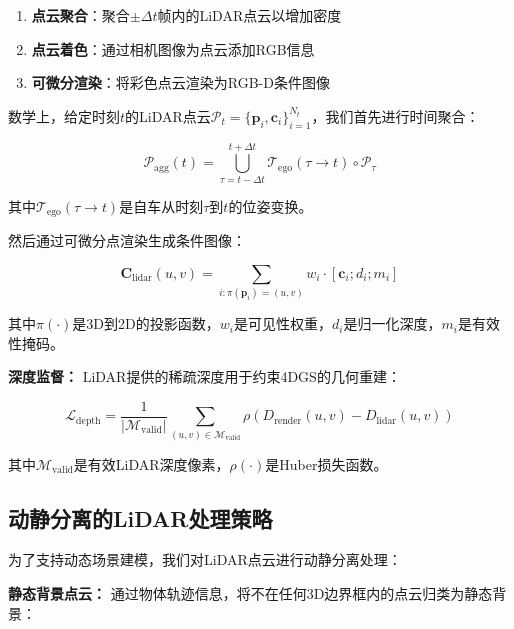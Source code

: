 \begin{enumerate}
\item \textbf{点云聚合}：聚合$\pm\Delta t$帧内的LiDAR点云以增加密度
\item \textbf{点云着色}：通过相机图像为点云添加RGB信息
\item \textbf{可微分渲染}：将彩色点云渲染为RGB-D条件图像
\end{enumerate}

数学上，给定时刻$t$的LiDAR点云$\mathcal{P}_t = \{\mathbf{p}_i, \mathbf{c}_i\}_{i=1}^{N_t}$，我们首先进行时间聚合：

\begin{equation}
\mathcal{P}_{\text{agg}}(t) = \bigcup_{\tau=t-\Delta t}^{t+\Delta t} \mathcal{T}_{\text{ego}}(\tau \rightarrow t) \circ \mathcal{P}_\tau
\label{eq:lidar_aggregation}
\end{equation}

其中$\mathcal{T}_{\text{ego}}(\tau \rightarrow t)$是自车从时刻$\tau$到$t$的位姿变换。

然后通过可微分点渲染生成条件图像：

\begin{equation}
\mathbf{C}_{\text{lidar}}(u,v) = \sum_{i: \pi(\mathbf{p}_i) = (u,v)} w_i \cdot [\mathbf{c}_i; d_i; m_i]
\label{eq:lidar_condition_generation}
\end{equation}

其中$\pi(\cdot)$是3D到2D的投影函数，$w_i$是可见性权重，$d_i$是归一化深度，$m_i$是有效性掩码。

\textbf{深度监督：}
LiDAR提供的稀疏深度用于约束4DGS的几何重建：

\begin{equation}
\mathcal{L}_{\text{depth}} = \frac{1}{|\mathcal{M}_{\text{valid}}|} \sum_{(u,v) \in \mathcal{M}_{\text{valid}}} \rho(D_{\text{render}}(u,v) - D_{\text{lidar}}(u,v))
\label{eq:depth_supervision}
\end{equation}

其中$\mathcal{M}_{\text{valid}}$是有效LiDAR深度像素，$\rho(\cdot)$是Huber损失函数。

\subsection{动静分离的LiDAR处理策略}

为了支持动态场景建模，我们对LiDAR点云进行动静分离处理：

\textbf{静态背景点云：}
通过物体轨迹信息，将不在任何3D边界框内的点云归类为静态背景：

